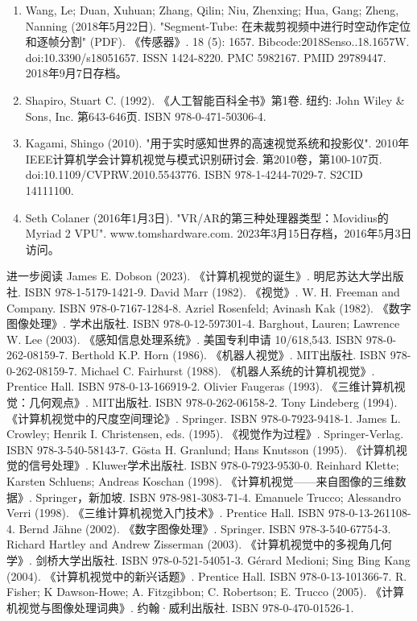 \begin{enumerate}
\item Wang, Le; Duan, Xuhuan; Zhang, Qilin; Niu, Zhenxing; Hua, Gang; Zheng, Nanning (2018年5月22日). "Segment-Tube: 在未裁剪视频中进行时空动作定位和逐帧分割" (PDF). 《传感器》. 18 (5): 1657. Bibcode:2018Senso..18.1657W. doi:10.3390/s18051657. ISSN 1424-8220. PMC 5982167. PMID 29789447. 2018年9月7日存档。
\item Shapiro, Stuart C. (1992). 《人工智能百科全书》第1卷. 纽约: John Wiley & Sons, Inc. 第643-646页. ISBN 978-0-471-50306-4.
\item Kagami, Shingo (2010). "用于实时感知世界的高速视觉系统和投影仪". 2010年IEEE计算机学会计算机视觉与模式识别研讨会. 第2010卷，第100-107页. doi:10.1109/CVPRW.2010.5543776. ISBN 978-1-4244-7029-7. S2CID 14111100.
\item Seth Colaner (2016年1月3日). "VR/AR的第三种处理器类型：Movidius的Myriad 2 VPU". www.tomshardware.com. 2023年3月15日存档，2016年5月3日访问。
\end{enumerate}
进一步阅读  
James E. Dobson (2023). 《计算机视觉的诞生》. 明尼苏达大学出版社. ISBN 978-1-5179-1421-9.  
David Marr (1982). 《视觉》. W. H. Freeman and Company. ISBN 978-0-7167-1284-8.  
Azriel Rosenfeld; Avinash Kak (1982). 《数字图像处理》. 学术出版社. ISBN 978-0-12-597301-4.  
Barghout, Lauren; Lawrence W. Lee (2003). 《感知信息处理系统》. 美国专利申请 10/618,543. ISBN 978-0-262-08159-7.  
Berthold K.P. Horn (1986). 《机器人视觉》. MIT出版社. ISBN 978-0-262-08159-7.  
Michael C. Fairhurst (1988). 《机器人系统的计算机视觉》. Prentice Hall. ISBN 978-0-13-166919-2.  
Olivier Faugeras (1993). 《三维计算机视觉：几何观点》. MIT出版社. ISBN 978-0-262-06158-2.  
Tony Lindeberg (1994). 《计算机视觉中的尺度空间理论》. Springer. ISBN 978-0-7923-9418-1.  
James L. Crowley; Henrik I. Christensen, eds. (1995). 《视觉作为过程》. Springer-Verlag. ISBN 978-3-540-58143-7.  
Gösta H. Granlund; Hans Knutsson (1995). 《计算机视觉的信号处理》. Kluwer学术出版社. ISBN 978-0-7923-9530-0.  
Reinhard Klette; Karsten Schluens; Andreas Koschan (1998). 《计算机视觉——来自图像的三维数据》. Springer，新加坡. ISBN 978-981-3083-71-4.  
Emanuele Trucco; Alessandro Verri (1998). 《三维计算机视觉入门技术》. Prentice Hall. ISBN 978-0-13-261108-4.  
Bernd Jähne (2002). 《数字图像处理》. Springer. ISBN 978-3-540-67754-3.  
Richard Hartley and Andrew Zisserman (2003). 《计算机视觉中的多视角几何学》. 剑桥大学出版社. ISBN 978-0-521-54051-3.  
Gérard Medioni; Sing Bing Kang (2004). 《计算机视觉中的新兴话题》. Prentice Hall. ISBN 978-0-13-101366-7.  
R. Fisher; K Dawson-Howe; A. Fitzgibbon; C. Robertson; E. Trucco (2005). 《计算机视觉与图像处理词典》. 约翰·威利出版社. ISBN 978-0-470-01526-1.  
